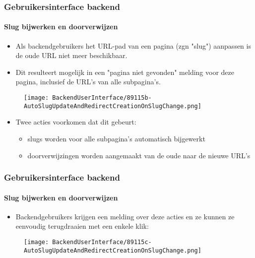 
\begin{frame}[fragile]
	\frametitle{Gebruikersinterface backend}
	\framesubtitle{Slug bijwerken en doorverwijzen}

	\begin{itemize}
		\item Als backendgebruikers het URL-pad van een pagina (zgn "slug") aanpassen
			is de oude URL niet meer beschikbaar.
		\item Dit resulteert mogelijk in een "pagina niet gevonden" melding voor deze
			pagina, inclusief de URL's van alle subpagina's.
	\end{itemize}

	\begin{figure}
		\texttt{[image: BackendUserInterface/89115b-AutoSlugUpdateAndRedirectCreationOnSlugChange.png]}
	\end{figure}

	\begin{itemize}
		\item Twee acties voorkomen dat dit gebeurt:

			\begin{itemize}
				\item slugs worden voor alle subpagina's automatisch bijgewerkt
				\item doorverwijzingen worden aangemaakt van de oude naar de nieuwe URL's
			\end{itemize}

	\end{itemize}

\end{frame}


\begin{frame}[fragile]
	\frametitle{Gebruikersinterface backend}
	\framesubtitle{Slug bijwerken en doorverwijzen}

	\begin{itemize}
		\item Backendgebruikers krijgen een melding over deze acties en ze kunnen
			ze eenvoudig terugdraaien met een enkele klik:
	\end{itemize}

	\begin{figure}
		\texttt{[image: BackendUserInterface/89115c-AutoSlugUpdateAndRedirectCreationOnSlugChange.png]}
	\end{figure}

\end{frame}

